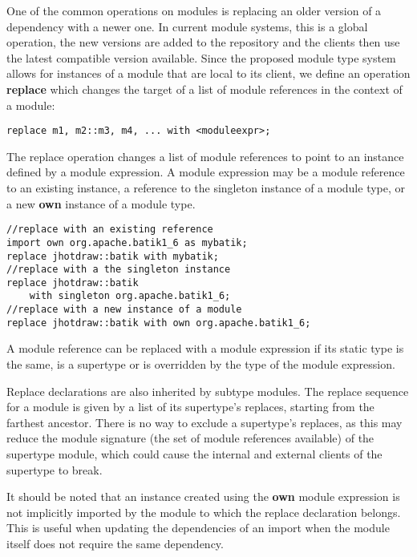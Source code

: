 
One of the common operations on modules is replacing an older version of a
dependency with a newer one. In current module systems, this is a global operation,
the new versions are added to the repository and the clients then use the latest
compatible version available. Since the proposed module type system allows for instances
of a module that are local to its client, we define an operation \textbf{replace} which
changes the target of a list of module references in the context of a module:

\begin{lstlisting}
replace m1, m2::m3, m4, ... with <moduleexpr>;
\end{lstlisting}

The replace operation changes a list of module references to point to an instance
defined by a module expression. A module expression may be a module reference to
an existing instance, a reference to the singleton instance of a module type, or
a new \textbf{own} instance of a module type.

\begin{lstlisting}[caption=Module Expressions for Replace]
//replace with an existing reference
import own org.apache.batik1_6 as mybatik;
replace jhotdraw::batik with mybatik;
//replace with a the singleton instance
replace jhotdraw::batik 
	with singleton org.apache.batik1_6;
//replace with a new instance of a module
replace jhotdraw::batik with own org.apache.batik1_6;
\end{lstlisting}

A module reference can be replaced with a module expression if its static type
is the same, is a supertype or is overridden by the type of the module expression.

Replace declarations are also inherited by subtype modules. The replace sequence for a
module is given by a list of its supertype's replaces, starting from the farthest
ancestor. There is no way to exclude a supertype's replaces, as
this may reduce the module signature (the set of module references available) of
the supertype module, which could cause the internal and external clients of
the supertype to break.

It should be noted that an instance created using the \textbf{own} module expression is not
implicitly imported by the module to which the replace declaration belongs. This
is useful when updating the dependencies of an import when the module itself
does not require the same dependency.

